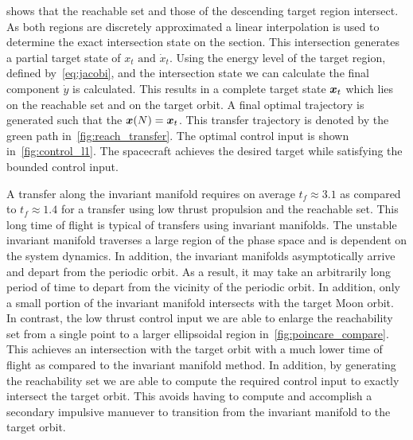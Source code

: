 \documentclass[smallcondensed]{svjour3}
\begin{document}
 shows that the reachable set and those of the descending target region intersect.
As both regions are discretely approximated a linear interpolation is used to determine the exact intersection state on the \Poincare section.
This intersection generates a partial target state of \( x_t \text{ and } \dot{x}_t \).
Using the energy level of the target region, defined by~\cref{eq:jacobi}, and the intersection state we can calculate the final component \( \dot{y} \) is calculated. 
This results in a complete target state \( \bm{x}_t \) which lies on the reachable set and on the target orbit. 
A final optimal trajectory is generated such that the \( \bm{x}(N) = \bm{x}_t \).
This transfer trajectory is denoted by the green path in~\cref{fig:reach_transfer}.
The optimal control input is shown in~\cref{fig:control_l1}. 
The spacecraft achieves the desired target while satisfying the bounded control input.

A transfer along the invariant manifold requires on average \( t_f \approx 3.1 \) as compared to \( t_f \approx 1.4 \) for a transfer using low thrust propulsion and the reachable set.
This long time of flight is typical of transfers using invariant manifolds.
The unstable invariant manifold traverses a large region of the phase space and is dependent on the system dynamics. 
In addition, the invariant manifolds asymptotically arrive and depart from the periodic orbit. 
As a result, it may take an arbitrarily long period of time to depart from the vicinity of the periodic orbit.
In addition, only a small portion of the invariant manifold intersects with the target Moon orbit.
In contrast, the low thrust control input we are able to enlarge the reachability set from a single point to a larger ellipsoidal region in~\cref{fig:poincare_compare}.
This achieves an intersection with the target orbit with a much lower time of flight as compared to the invariant manifold method.
In addition, by generating the reachability set we are able to compute the required control input to exactly intersect the target orbit.
This avoids having to compute and accomplish a secondary impulsive manuever to transition from the invariant manifold to the target orbit.
\end{document}

